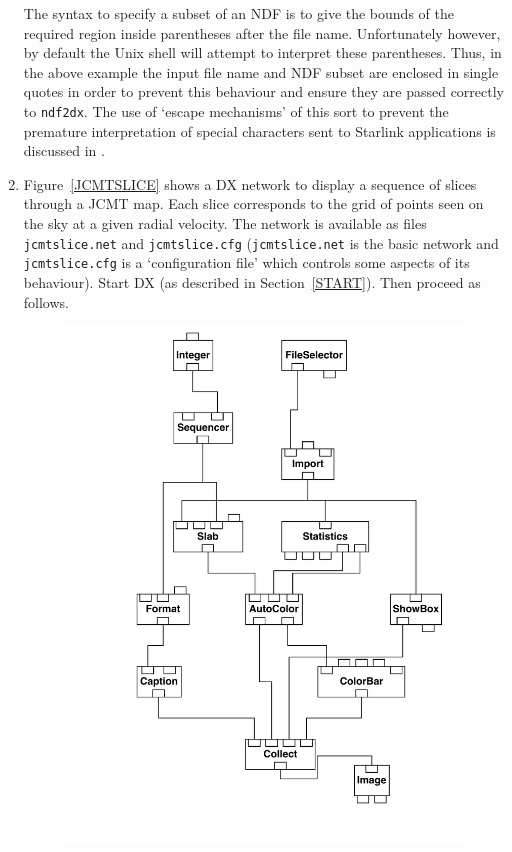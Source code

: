 \documentclass[twoside,11pt]{starlink}
\begin{document}
\begin{enumerate}
\begin{terminalv}
\end{terminalv}

   The syntax to specify a subset of an NDF is to give the bounds of
   the required region inside parentheses after the file name.
   Unfortunately however, by default the Unix shell will attempt to
   interpret these parentheses.  Thus, in the above example the input
   file name and NDF subset are enclosed in single quotes in order to
   prevent this behaviour and ensure they are passed correctly to \texttt{ndf2dx}.  The use of `escape mechanisms'  of this sort to prevent the
   premature interpretation of special characters sent to Starlink
   applications is discussed in \cite{SC4}.

  \item Figure~\ref{JCMTSLICE} shows a DX network to display a sequence
   of slices through a JCMT map.  Each slice corresponds to the grid
   of points seen on the sky at a given radial velocity.  The network
   is available as files \texttt{jcmtslice.net} and \texttt{jcmtslice.cfg}
   (\texttt{jcmtslice.net} is the basic network and \texttt{jcmtslice.cfg} is
   a `configuration file' which controls some aspects of its behaviour).
   Start DX (as described in Section~\ref{START}).  Then proceed as
   follows.

  \begin{figure}[htbp]

  \begin{center}
  \leavevmode
  \includegraphics[width=450pt]{sc2_jcmtslice}
  \end{center}


\end{figure}
\end{enumerate}
\end{document}
